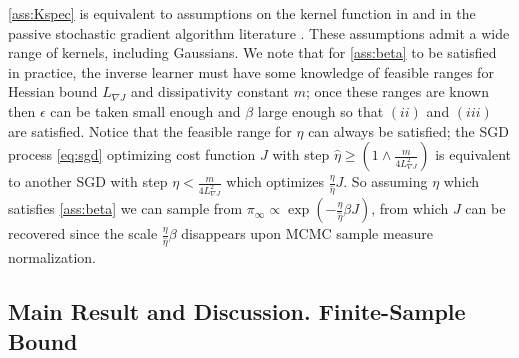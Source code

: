 \documentclass[journal,onecolumn]{IEEEtran}
\newcommand{\step}{\epsilon}
\newcommand{\grad}{\nabla}
\newcommand{\rew}{J}
\newcommand{\gibbs}{\ids_{\infty}}
\newcommand{\sgdstep}{\eta}
\newcommand{\ids}{\pi}
\newcommand{\dissm}{m}
\newcommand{\lipGJ}{L_{\grad\rew}}
\begin{document}
\ref{ass:Kspec} is equivalent to assumptions on the kernel function in \cite{krishnamurthy2021langevin} and in the passive stochastic gradient algorithm literature \cite{nazin1989passive}. These assumptions admit a wide range of kernels, including Gaussians.
We note that for \ref{ass:beta} to be satisfied in practice, the inverse learner must have some knowledge of feasible ranges for Hessian bound $\lipGJ$ and dissipativity constant $\dissm$; once these ranges are known then $\step$ can be taken small enough and $\beta$ large enough so that $(ii)$ and $(iii)$ are satisfied. Notice that the feasible range for $\sgdstep$ can always be satisfied; the SGD process \eqref{eq:sgd} optimizing cost function $\rew$ with step $\hat{\eta} \geq (1 \wedge \frac{\dissm}{4\lipGJ^2})$ is equivalent to another SGD with step $\eta <\frac{\dissm}{4\lipGJ^2}$ which optimizes $\frac{\eta}{\hat{\eta}}\rew$. So assuming $\sgdstep$ which satisfies \ref{ass:beta} we can sample from $\gibbs \propto \exp(-\frac{\eta}{\hat{\eta}}\beta\rew)$, from which $\rew$ can be recovered since the scale $\frac{\eta}{\hat{\eta}}\beta$ disappears upon MCMC sample measure normalization.



\subsection{Main Result and Discussion. Finite-Sample Bound}
\label{sec:mainresult}
\end{document}

